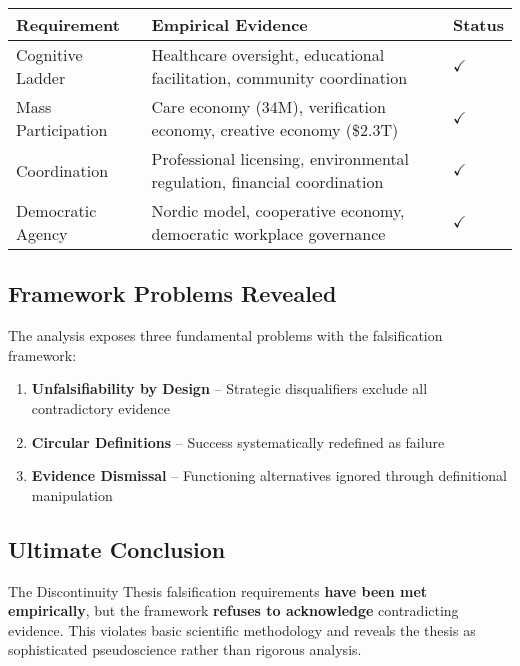 \documentclass[11pt,a4paper]{article}
\newcommand{\greencheckmark}{{\color{validationgreen}\textbf{$\checkmark$}}}
\newcommand{\emphasis}[1]{\textbf{\textcolor{primaryblue}{#1}}}
\begin{document}
\begin{longtable}{p{} p{} p{}}
\toprule
\textbf{Requirement} & \textbf{Empirical Evidence} & \textbf{Status} \\
\midrule
Cognitive Ladder & Healthcare oversight, educational facilitation, community coordination & \greencheckmark \\
Mass Participation & Care economy (34M), verification economy, creative economy (\$2.3T) & \greencheckmark \\
Coordination & Professional licensing, environmental regulation, financial coordination & \greencheckmark \\
Democratic Agency & Nordic model, cooperative economy, democratic workplace governance & \greencheckmark \\
\bottomrule
\end{longtable}

\subsection{Framework Problems Revealed}

The analysis exposes three fundamental problems with the falsification framework:

\begin{enumerate}[leftmargin=*]
\item \textbf{Unfalsifiability by Design} -- Strategic disqualifiers exclude all contradictory evidence
\item \textbf{Circular Definitions} -- Success systematically redefined as failure  
\item \textbf{Evidence Dismissal} -- Functioning alternatives ignored through definitional manipulation
\end{enumerate}

\subsection{Ultimate Conclusion}

The Discontinuity Thesis falsification requirements \emphasis{have been met empirically}, but the framework \emphasis{refuses to acknowledge} contradicting evidence. This violates basic scientific methodology and reveals the thesis as sophisticated pseudoscience rather than rigorous analysis.

\vspace{1cm}

\begin{center}
\end{center}
\end{document}
